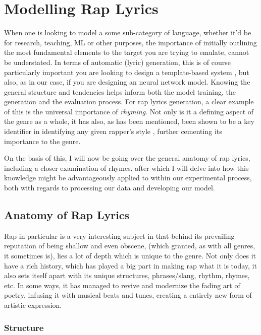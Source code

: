 \section{Modelling Rap Lyrics}
\label{sec:modelling-rap}

When one is looking to model a some sub-category of language, whether it'd be for research, teaching, ML or other purposes, the importance of initially outlining the most fundamental elements to the target you are trying to emulate, cannot be understated. In terms of automatic (lyric) generation, this is of course particularly important you are looking to design a template-based system \cite{Goncalo2012PoeTryMe}, but also, as in our case, if you are designing an neural network model. Knowing the general structure and tendencies helps inform both the model training, the generation and the evaluation process. For rap lyrics generation, a clear example of this is the universal importance of \textit{rhyming}. Not only is it a defining aspect of the genre as a whole, it has also, as has been mentioned, been shown to be a key identifier in identifying any given rapper’s style \cite{potash-etal-2015-ghostwriter}, further cementing its importance to the genre.

On the basis of this, I will now be going over the general anatomy of rap lyrics, including a closer examination of rhymes, after which I will delve into how this knowledge might be advantageously applied to within our experimental process, both with regards to processing our data and developing our model.

\subsection{Anatomy of Rap Lyrics}
\label{sec:anatomy-of-rap}

Rap in particular is a very interesting subject in that behind its prevailing reputation of being shallow and even obscene, (which granted, as with all genres, it sometimes is), lies a lot of depth which is unique to the genre. Not only does it have a rich history, which has played a big part in making rap what it is today, it also sets itself apart with its unique structures, phrases/slang, rhythm, rhymes, etc. In some ways, it has managed to revive and modernize the fading art of poetry, infusing it with musical beats and tunes, creating a entirely new form of artistic expression.

\subsubsection{Structure}
